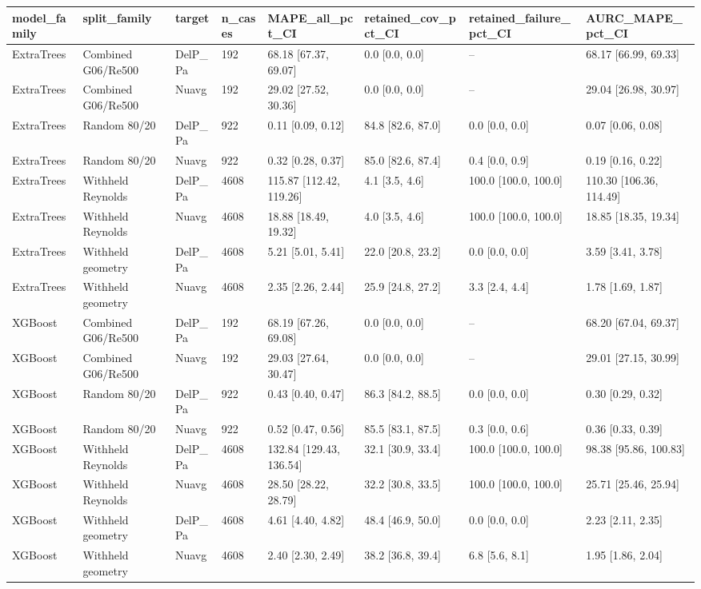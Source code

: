 \begin{tabular}{llllllll}
\hline
model_family & split_family & target & n_cases & MAPE_all_pct_CI & retained_cov_pct_CI & retained_failure_pct_CI & AURC_MAPE_pct_CI \\
\hline
ExtraTrees & Combined G06/Re500 & DelP_Pa & 192 & 68.18 [67.37, 69.07] & 0.0 [0.0, 0.0] & -- & 68.17 [66.99, 69.33] \\
ExtraTrees & Combined G06/Re500 & Nuavg & 192 & 29.02 [27.52, 30.36] & 0.0 [0.0, 0.0] & -- & 29.04 [26.98, 30.97] \\
ExtraTrees & Random 80/20 & DelP_Pa & 922 & 0.11 [0.09, 0.12] & 84.8 [82.6, 87.0] & 0.0 [0.0, 0.0] & 0.07 [0.06, 0.08] \\
ExtraTrees & Random 80/20 & Nuavg & 922 & 0.32 [0.28, 0.37] & 85.0 [82.6, 87.4] & 0.4 [0.0, 0.9] & 0.19 [0.16, 0.22] \\
ExtraTrees & Withheld Reynolds & DelP_Pa & 4608 & 115.87 [112.42, 119.26] & 4.1 [3.5, 4.6] & 100.0 [100.0, 100.0] & 110.30 [106.36, 114.49] \\
ExtraTrees & Withheld Reynolds & Nuavg & 4608 & 18.88 [18.49, 19.32] & 4.0 [3.5, 4.6] & 100.0 [100.0, 100.0] & 18.85 [18.35, 19.34] \\
ExtraTrees & Withheld geometry & DelP_Pa & 4608 & 5.21 [5.01, 5.41] & 22.0 [20.8, 23.2] & 0.0 [0.0, 0.0] & 3.59 [3.41, 3.78] \\
ExtraTrees & Withheld geometry & Nuavg & 4608 & 2.35 [2.26, 2.44] & 25.9 [24.8, 27.2] & 3.3 [2.4, 4.4] & 1.78 [1.69, 1.87] \\
XGBoost & Combined G06/Re500 & DelP_Pa & 192 & 68.19 [67.26, 69.08] & 0.0 [0.0, 0.0] & -- & 68.20 [67.04, 69.37] \\
XGBoost & Combined G06/Re500 & Nuavg & 192 & 29.03 [27.64, 30.47] & 0.0 [0.0, 0.0] & -- & 29.01 [27.15, 30.99] \\
XGBoost & Random 80/20 & DelP_Pa & 922 & 0.43 [0.40, 0.47] & 86.3 [84.2, 88.5] & 0.0 [0.0, 0.0] & 0.30 [0.29, 0.32] \\
XGBoost & Random 80/20 & Nuavg & 922 & 0.52 [0.47, 0.56] & 85.5 [83.1, 87.5] & 0.3 [0.0, 0.6] & 0.36 [0.33, 0.39] \\
XGBoost & Withheld Reynolds & DelP_Pa & 4608 & 132.84 [129.43, 136.54] & 32.1 [30.9, 33.4] & 100.0 [100.0, 100.0] & 98.38 [95.86, 100.83] \\
XGBoost & Withheld Reynolds & Nuavg & 4608 & 28.50 [28.22, 28.79] & 32.2 [30.8, 33.5] & 100.0 [100.0, 100.0] & 25.71 [25.46, 25.94] \\
XGBoost & Withheld geometry & DelP_Pa & 4608 & 4.61 [4.40, 4.82] & 48.4 [46.9, 50.0] & 0.0 [0.0, 0.0] & 2.23 [2.11, 2.35] \\
XGBoost & Withheld geometry & Nuavg & 4608 & 2.40 [2.30, 2.49] & 38.2 [36.8, 39.4] & 6.8 [5.6, 8.1] & 1.95 [1.86, 2.04] \\
\hline
\end{tabular}
